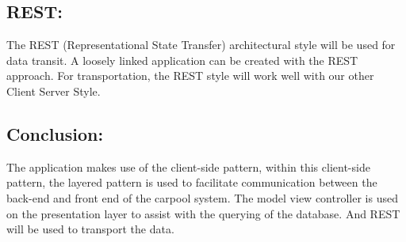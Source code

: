 \documentclass[hidelinks, 12pt, a4paper]{article}
\begin{document}
\subsection{\textbf{REST:}}
\newline
The REST (Representational State Transfer) architectural style will be used for data transit. A loosely linked application can be created with the REST approach. For transportation, the REST style will work well with our other Client Server Style.
\subsection{\textbf{Conclusion:}}
The application makes use of the client-side pattern, within this client-side pattern, the layered pattern is used to facilitate communication between the back-end and front end of the carpool system. The model view controller is used on the presentation layer to assist with the querying of the database. And REST will be used to transport the data.
\newpage
\end{document}
